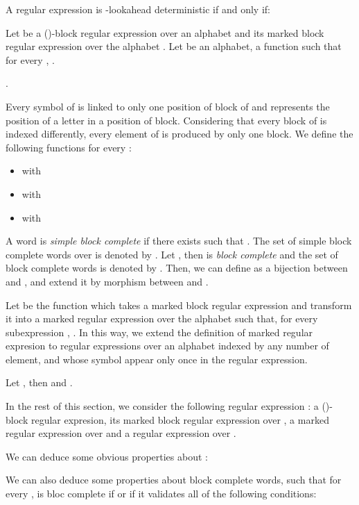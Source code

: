 \documentclass{llncs}
\begin{document}
\begin{lemma}[\cite{HW08}]
	A regular expression  is -lookahead deterministic if and only if:
	
\end{lemma}


	Let  be a ()-block regular expression over an alphabet  and  its marked block regular expression  over the alphabet .
	Let  be an alphabet,  a function such that for every , .
	
\begin{example}
	.
\end{example}
	
	Every symbol of  is linked to only one position of block of  and represents the position of a letter in a position of block.
	Considering that every block of  is indexed differently, every element of  is produced by only one block.
	We define the following functions for every  :
	\begin{itemize}
		\item  with 
		\item  with 
		\item  with 
	\end{itemize}
	
	A word  is \emph{simple block complete} if there exists  such that .
	The set of simple block complete words over  is denoted by .
	Let , then  is \emph{block complete} and the set of block complete words is denoted by .
	Then, we can define  as a bijection between  and , and extend it by morphism between  and .
	
	Let  be the function which takes a marked block regular expression  and transform it into a marked regular expression  over the alphabet  such that, for every subexpression , .
	In this way, we extend the definition of marked regular expresion to regular expressions over an alphabet indexed by any number of element, and whose symbol appear only once in the regular expression.
	
	\begin{example}
		Let , then  and .
	\end{example}
	
	In the rest of this section, we consider the following regular expression :  a ()-block regular expresion, its marked block regular expression  over ,  a marked regular expression over  and  a regular expression over .

We can deduce some obvious properties about :
	

	
	We can also deduce some properties about block complete words, such that for every ,  is bloc complete if  or if it validates all of the following conditions:
	
\end{document}
